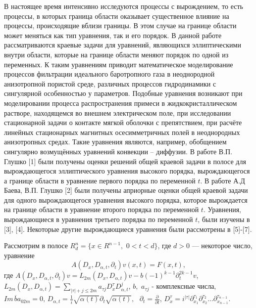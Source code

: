 



\vzmscaption

В настоящее время интенсивно исследуются процессы с вырождением, то есть
процессы, в которых граница области оказывает существенное влияние на
процессы, происходящие вблизи границы. В этом случае на границе области
может меняться как тип уравнения, так и его порядок. В данной работе
рассматриваются краевые задачи для уравнений, являющихся эллиптическими
внутри области, которые на границе области меняют порядок по одной из
переменных. К таким уравнениям приводит математическое моделирование
процессов фильтрации идеального баротропного газа в неоднородной
анизотропной пористой среде, различных процессов гидродинамики с сингулярной
особенностью у параметров. Подобные уравнения возникают при моделировании
процесса распространения примеси в жидкокристаллическом растворе,
находящемся во внешнем электрическом поле, при исследовании стационарной
задачи о контакте мягкой оболочки с препятствием, при расчёте линейных
стационарных магнитных осесимметричных полей в неоднородных анизотропных
средах. Такие уравнения являются, например, обобщением сингулярно
возмущённых уравнений конвекции -- диффузии. В работе В.П. Глушко [1] были
получены оценки решений общей краевой задачи в полосе для вырождающегося
эллиптического уравнения высокого порядка, вырождающегося а границе области
в уравнение первого порядка по переменной $t$. В работе А.Д Баева, В.П.
Глушко [2] были получены априорные оценки общей краевой задачи для одного
вырождающегося уравнения высокого порядка, которое вырождается на границе
области в уравнение второго порядка по переменной $t$. Уравнения,
вырождающиеся в уравнения третьего порядка по переменной $t$, были изучены в
[3], [4]. Некоторые другие вырождающиеся уравнения были рассмотрены в
[5]-[7].

Рассмотрим в полосе $R_d^n = \{x \in R^{n - 1},\,\,0 < t < d\}$, где $d >
0$ --- некоторое число, уравнение
\begin{equation}
\label{eq4500}
A(D_x ,D_{\alpha ,t} ,\partial _t )v(x,t) = F(x,t),
\end{equation}
где
$A(D_x ,D_{\alpha ,t} ,\partial _t )v = L_{2m} (D_x ,D_{\alpha ,t} )v -
b( - 1)^{k - 1}\partial _t^{2k - 1} v$,
\linebreak
$L_{2m} (D_x ,D_{\alpha ,t} ) =
\sum\limits_{\left| \tau \right| + j \leqslant 2m} {a_{\tau j} D_x^\tau D_{\alpha
,t}^j } $, $b,\,\,a_{\tau j} $ - комплексные числа, $Im\,\overline b a_{02m}
= 0$, $D_{\alpha ,t} = \frac{1}{i}\sqrt {\alpha (t)} \partial _t \sqrt
{\alpha (t)} ,\,\,\,\,\partial _t = \frac{\partial }{\partial t}$, $D_x^\tau
= i^{\left| \tau \right|}\partial _{x_1 }^{\tau _1 } \partial _{x_2 }^{\tau
_2 } ...\partial _{x_{n - 1} }^{\tau _{n - 1} } $.

